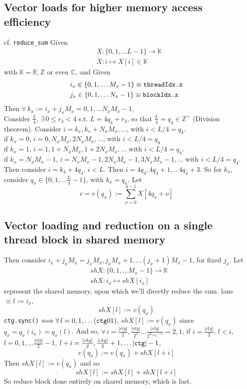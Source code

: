 \documentclass[10pt]{amsart}
\begin{document}
\begin{multicols*}{2}
\section{Vector loads for higher memory access efficiency}  
cf. \verb|reduce_sum|  
Given 
\[
\begin{aligned}
& X : \lbrace 0 ,1,\dots L-1\rbrace \to \mathbb{K}  \\
& X:i \mapsto X[i] \in \mathbb{K}  
\end{aligned}
\] with $\mathbb{K} = \mathbb{R}, \mathbb{Z}$ or even $\mathbb{C}$, and  
Given 
\[
\begin{aligned}
& i_x \in \lbrace 0,1,\dots M_x-1 \rbrace \equiv \verb|threadIdx.x| \\ 
& j_x \in \lbrace 0,1,\dots N_x-1 \rbrace \equiv \verb|blockIdx.x| 
\end{aligned}
\]
Then $\forall\, k_x := i_x + j_x M_x = 0,1,\dots N_xM_x-1$, \\
Consider $\frac{L}{4}$, $\exists \, 0 \leq r_4 < 4 $ s.t. $L=4q_4 + r_4$, so that $\frac{L}{4} = q_4 \in \mathbb{Z}^+$ (Division theorem).  
Consider $i=k_x, k_x + N_xM_x, \dots $, with $i< L/4 = q_4$.  \\
if $k_x=0$, $i=0,N_xM_x,2N_xM_x, \dots $, with $i< L/4 = q_4$ \\
if $k_x=1$, $i=1,1+N_xM_x,1+2N_xM_x, \dots $ with $i<L/4 = q_4$.  \\
if $k_x=N_xM_x-1$, $i=N_xM_x-1,2N_xM_x-1,3N_xM_x-1, \dots$ with $i<L/4 = q_4$.  
Then consider $i=k_4 + 4q_4$, $i<L$.  Then $i=4q_4, 4q_4+1, \dots 4q_4 + 3$.  
So for $k_x$, consider $q_x \in \lbrace 0 ,1,\dots \frac{L}{4}-1 \rbrace$, with $k_x=q_x$.  
Let 
\[
v = v(q_x) := \sum_{\nu=0}^{4-1} X[4q_x + \nu]
\]
\subsection{Vector loading and reduction on a single thread block in shared memory}
Then consider $i_x + j_x M_x = j_xM_x, j_x M_x + 1, \dots (j_x+1)M_x-1$, for fixed $j_x$.  
Let 
\[
\begin{aligned}
& shX : \lbrace 0 ,1,\dots M_x -1\rbrace \to \mathbb{K} \\ 
& shX: i_x \mapsto shX[i_x] 
\end{aligned}
\]
represent the shared memory, upon which we'll directly reduce the sum.  
lane $\equiv l := i_x$, 
\[
shX[l] := v(q_x)
\]
\verb|ctg.sync()| $\Longleftrightarrow \forall \, l = 0,1,\dots (\verb|ctg|01)$, $shX[l] := v(q_x)$ since $q_x = q_x(i_x) = q_x(l)$.  
And so, $\forall \, i = \frac{ |ctg| }{2}, \frac{ |ctg|}{2^2} \dots \frac{ |ctg| }{2^{ K_{| ctg|}-1}} = 2,1$, 
if $i=\frac{ |ctg|}{2}$, $l <i$, $l=0,1,\dots \frac{|ctg|}{2} - 1$, $l+i = \frac{|ctg|}{2}, \frac{|ctg|}{2} + 1, \dots |\verb|ctg|| - 1$, 
\[
v(q_x) := v(q_x) + shX[l+i]
\] 
Then $shX[l] := v(q_x)$ and so 
\[
shX[l] := shX[l] + shX[l+i]
\]
So reduce block done entirely on shared memory, which is fast.  





\end{multicols*}
\end{document}
